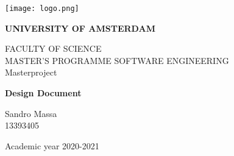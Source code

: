 \thispagestyle{empty}
\begin{titlepage}
  \begin{center}
    \texttt{[image: logo.png]}
  \end{center}
  \bfseries{
    \begin{center}
      \large
     \textbf{UNIVERSITY OF AMSTERDAM}\\
      \normalsize
      
      \vspace*{.5truecm}
      FACULTY OF SCIENCE\\
      \vspace*{.5truecm}
      MASTER'S PROGRAMME SOFTWARE ENGINEERING\\
      \vspace*{2truecm} \large
      Masterproject

     
        
      \LARGE
      \textbf{{Design Document}}\\



    \end{center}
    \vspace*{2.5truecm} \large
    \begin{flushleft}


      Sandro Massa\\
      13393405\\

    \end{flushleft}
    \vspace*{0.7truecm}
    \begin{center}
      Academic year 2020-2021
    \end{center} \clearpage
  }
\end{titlepage}